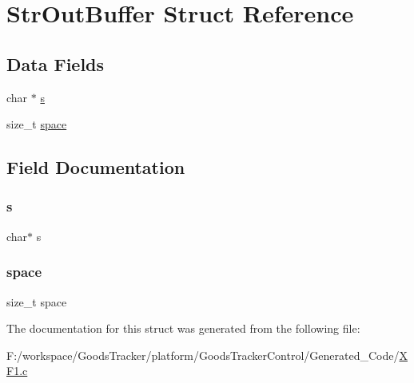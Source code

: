 \hypertarget{struct_str_out_buffer}{}\section{Str\+Out\+Buffer Struct Reference}
\label{struct_str_out_buffer}
\subsection*{Data Fields}
\begin{DoxyCompactItemize}
\item 
char $\ast$ \hyperlink{struct_str_out_buffer_ab51cd24d34f6509eafb5e059f4c7d10e}{s}
\item 
size\+\_\+t \hyperlink{struct_str_out_buffer_aa792b5f1345191a83fb5f169cec561bd}{space}
\end{DoxyCompactItemize}


\subsection{Field Documentation}
\mbox{\label{struct_str_out_buffer_ab51cd24d34f6509eafb5e059f4c7d10e}} 
\subsubsection{\texorpdfstring{s}{s}}
{\footnotesize\ttfamily char$\ast$ s}

\mbox{\label{struct_str_out_buffer_aa792b5f1345191a83fb5f169cec561bd}} 
\subsubsection{\texorpdfstring{space}{space}}
{\footnotesize\ttfamily size\+\_\+t space}



The documentation for this struct was generated from the following file\+:\begin{DoxyCompactItemize}
\item 
F\+:/workspace/\+Goods\+Tracker/platform/\+Goods\+Tracker\+Control/\+Generated\+\_\+\+Code/\hyperlink{_x_f1_8c}{X\+F1.\+c}\end{DoxyCompactItemize}

